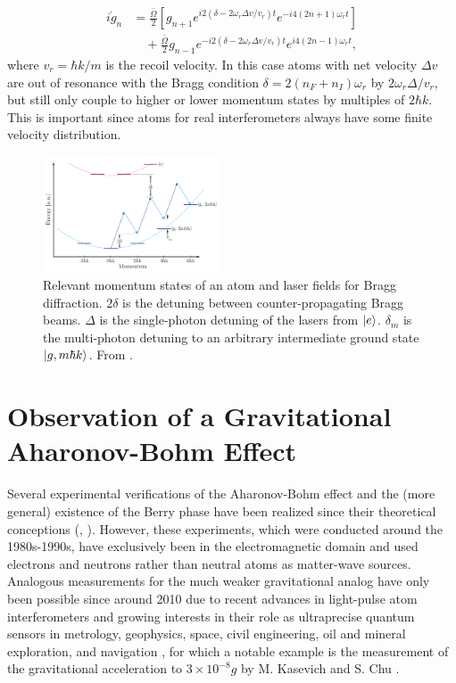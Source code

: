 \documentclass[reprint,
nofootinbib,
amsmath,amssymb,
aps]{revtex4-1}
\newcommand{\f}[2]{\frac{#1}{#2}}
\newcommand{\lb}{\left[}
\newcommand{\rb}{\right]}
\begin{document}
\begin{align*}
i\dot{g}_n &= \f{\bar{\Omega}}{2}\lb g_{n+1} e^{i2(\delta - 2\omega_r \Delta v/v_r)t} e^{-i4(2n+1)\omega_r t} \rb \\ 
& \quad + \f{\bar{\Omega}}{2}g_{n-1} e^{-i2(\delta - 2\omega_r \Delta v/v_r) t} e^{i4(2n-1)\omega_r t} ,
\end{align*}
where $v_r = \hbar k/m$ is the recoil velocity. In this case atoms with net velocity $\Delta v$ are out of resonance with the Bragg condition $\delta = 2(n_F + n_I)\omega_r$ by $2\omega_r \Delta / v_r$, but still only couple to higher or lower momentum states by multiples of $2\hbar k$. This is important since atoms for real interferometers always have some finite velocity distribution. 

\begin{figure}
	\includegraphics[width=0.47\textwidth]{Bragg.png}
	\caption{Relevant momentum states of an atom and laser fields for Bragg diffraction. $2\delta$ is the detuning between counter-propagating Bragg beams. $\Delta$ is the single-photon detuning of the lasers from $\ket{e}$. $\delta_m$ is the multi-photon detuning to an arbitrary intermediate ground state $\ket{g,m\hbar k}$. From \cite{estey2016precision}.}
	\label{fig:Bragg}
\end{figure}



\section{Observation of a Gravitational Aharonov-Bohm Effect}\label{sect:grav}
Several experimental verifications of the Aharonov-Bohm effect and the (more general) existence of the Berry phase have been realized since their theoretical conceptions (\cite{tonomura1986evidence}, \cite{cimmino1989observation}). However, these experiments, which were conducted around the 1980s-1990s, have exclusively been in the electromagnetic domain and used electrons and neutrons rather than neutral atoms as matter-wave sources. Analogous measurements for the much weaker gravitational analog have only been possible since around 2010 due to recent advances in light-pulse atom interferometers and growing interests in their role as ultraprecise quantum sensors in metrology, geophysics, space, civil engineering, oil and mineral exploration, and navigation \cite{bongs2019taking}, for which a notable example is the measurement of the gravitational acceleration to $3\times 10^{-8} g$ by M. Kasevich and S. Chu \cite{kasevich1992measurement}. 
\end{document}
